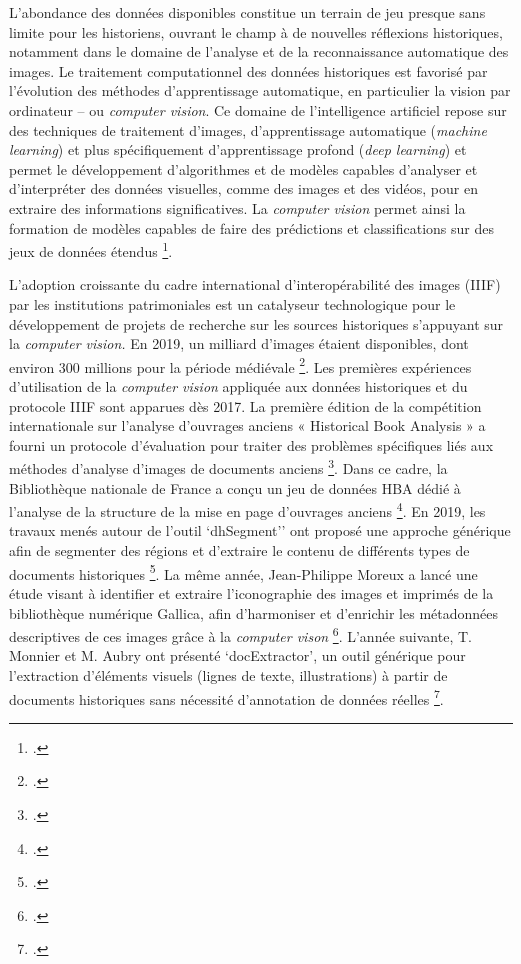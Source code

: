\documentclass[12pt,twoside]{book}
\begin{document}
L’abondance des données disponibles constitue un terrain de jeu presque sans limite pour les historiens, ouvrant le champ à de nouvelles réflexions historiques, notamment dans le domaine de l'analyse et de la reconnaissance automatique des images. Le traitement computationnel des données historiques est favorisé par l'évolution des méthodes d'apprentissage automatique, en particulier la vision par ordinateur – ou \textit{computer vision}.  Ce domaine de l’intelligence artificiel repose sur des techniques de traitement d'images, d'apprentissage automatique (\textit{machine learning}) et plus spécifiquement d'apprentissage profond (\textit{deep learning}) et permet le développement d'algorithmes et de modèles capables d'analyser et d'interpréter des données visuelles, comme des images et des vidéos, pour en extraire des informations significatives. La \textit{computer vision} permet ainsi la formation de modèles capables de faire des prédictions et classifications sur des jeux de données étendus \footcite{pedersoli_elastic_2015}. 

\newpage
L'adoption croissante du cadre international d'interopérabilité des images (IIIF) par les institutions patrimoniales est un catalyseur technologique pour le développement de projets de recherche sur les sources historiques s’appuyant sur la \textit{computer vision.} En 2019, un milliard d'images étaient disponibles, dont environ 300 millions pour la période médiévale \footcite[p.2]{aouinti_illumination_2022}. Les premières expériences d'utilisation de la \textit{computer vision} appliquée aux données historiques et du protocole IIIF sont apparues dès 2017. La première édition de la compétition internationale sur l’analyse d'ouvrages anciens « Historical Book Analysis » a fourni un protocole d'évaluation pour traiter des problèmes spécifiques liés aux méthodes d’analyse d’images de documents anciens \footcite{mehri_hba_2017}. Dans ce cadre, la Bibliothèque nationale de France a conçu un jeu de données HBA dédié à l'analyse de la structure de la mise en page d'ouvrages anciens \footcite{noauthor_hba_2017}. En 2019, les travaux menés autour de l’outil ‘dhSegment’’ ont proposé une approche générique afin de segmenter des régions et d'extraire le contenu de différents types de documents historiques \footcite{oliveira_dhsegment_2018}. La même année, Jean-Philippe Moreux a lancé une étude visant à identifier et extraire l’iconographie des images et imprimés de la bibliothèque numérique Gallica, afin d’harmoniser et d’enrichir les métadonnées descriptives de ces images grâce à la \textit{computer vison} \footcite{moreux_recherche_2019}. L'année suivante, T. Monnier et M. Aubry ont présenté ‘docExtractor’, un outil générique pour l'extraction d'éléments visuels (lignes de texte, illustrations) à partir de documents historiques sans nécessité d'annotation de données réelles \footcite{monnier_docextractor_2020}.
\end{document}
